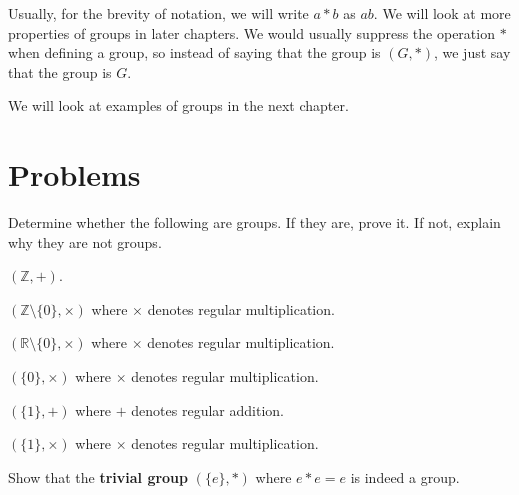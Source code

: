 \newpage

Usually, for the brevity of notation, we will write $a \ast b$ as $ab$. We will look at more properties of groups in later chapters. We would usually suppress the operation $\ast$ when defining a group, so instead of saying that the group is $(G, \ast)$, we just say that the group is $G$.

We will look at examples of groups in the next chapter.

\newpage

\section{Problems}
\begin{problem}
Determine whether the following are groups. If they are, prove it. If not, explain why they are not groups.
\begin{partquestions}{\alph*}
    \item $(\mathbb{Z}, +)$.
    \item $(\mathbb{Z} \setminus \{0\}, \times)$ where $\times$ denotes regular multiplication.
    \item $(\mathbb{R} \setminus \{0\}, \times)$ where $\times$ denotes regular multiplication.
    \item $(\{0\}, \times)$ where $\times$ denotes regular multiplication.
    \item $(\{1\}, +)$ where $+$ denotes regular addition.
    \item $(\{1\}, \times)$ where $\times$ denotes regular multiplication.
\end{partquestions}
\end{problem}

\begin{problem}
    Show that the \textbf{trivial group} $(\{e\}, *)$ where $e \ast e = e$ is indeed a group.
\end{problem}

